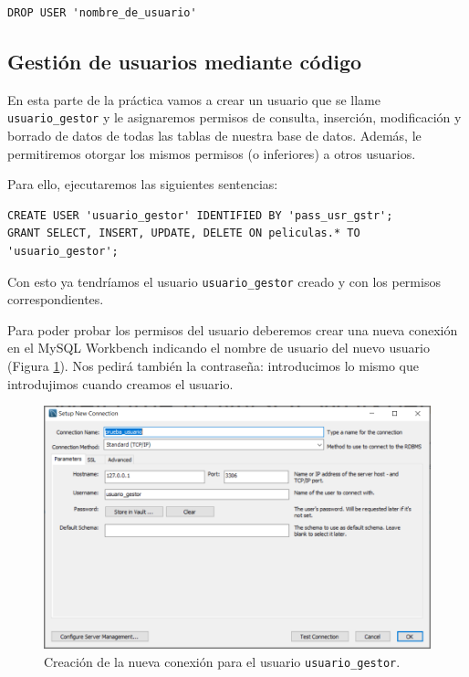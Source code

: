 \documentclass[a4paper]{article}
\begin{document}
\begin{verbatim}
DROP USER 'nombre_de_usuario'
\end{verbatim}


\subsection*{Gestión de usuarios mediante código}

En esta parte de la práctica vamos a crear un usuario que se llame \texttt{usuario\_gestor} y le asignaremos permisos de consulta, inserción, modificación y borrado de datos de todas las tablas de nuestra base de datos. Además, le permitiremos otorgar los mismos permisos (o inferiores) a otros usuarios.

Para ello, ejecutaremos las siguientes sentencias:

\begin{verbatim}
CREATE USER 'usuario_gestor' IDENTIFIED BY 'pass_usr_gstr';
GRANT SELECT, INSERT, UPDATE, DELETE ON peliculas.* TO 'usuario_gestor';
\end{verbatim}

Con esto ya tendríamos el usuario \texttt{usuario\_gestor} creado y con los permisos correspondientes.

Para poder probar los permisos del usuario deberemos crear una nueva conexión en el MySQL Workbench indicando el nombre de usuario del nuevo usuario (Figura \ref{fig:nueva-conexion}). Nos pedirá también la contraseña: introducimos lo mismo que introdujimos cuando creamos el usuario.

\begin{figure}[H]
    \centering
    \includegraphics[width=\textwidth]{figs/gestion-usuarios/nueva_conexion_usr.PNG}
    \caption{Creación de la nueva conexión para el usuario \texttt{usuario\_gestor}.}
    \label{fig:nueva-conexion}
\end{figure}
\end{document}

